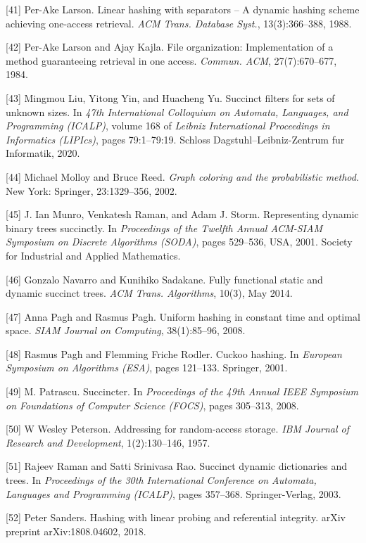 \documentclass[12pt,a4paper]{ctexart}
\theoremstyle{remark}
\begin{document}
[41] Per-Ake Larson. Linear hashing with separators -- A dynamic hashing scheme achieving one-access retrieval. \textit{ACM Trans. Database Syst.}, 13(3):366--388, 1988.

[42] Per-Ake Larson and Ajay Kajla. File organization: Implementation of a method guaranteeing retrieval in one access. \textit{Commun. ACM}, 27(7):670--677, 1984.

[43] Mingmou Liu, Yitong Yin, and Huacheng Yu. Succinct filters for sets of unknown sizes. In \textit{47th International Colloquium on Automata, Languages, and Programming (ICALP)}, volume 168 of \textit{Leibniz International Proceedings in Informatics (LIPIcs)}, pages 79:1--79:19. Schloss Dagstuhl--Leibniz-Zentrum fur Informatik, 2020.

[44] Michael Molloy and Bruce Reed. \textit{Graph coloring and the probabilistic method}. New York: Springer, 23:1329--356, 2002.

[45] J. Ian Munro, Venkatesh Raman, and Adam J. Storm. Representing dynamic binary trees succinctly. In \textit{Proceedings of the Twelfth Annual ACM-SIAM Symposium on Discrete Algorithms (SODA)}, pages 529--536, USA, 2001. Society for Industrial and Applied Mathematics.

[46] Gonzalo Navarro and Kunihiko Sadakane. Fully functional static and dynamic succinct trees. \textit{ACM Trans. Algorithms}, 10(3), May 2014.

[47] Anna Pagh and Rasmus Pagh. Uniform hashing in constant time and optimal space. \textit{SIAM Journal on Computing}, 38(1):85--96, 2008.

[48] Rasmus Pagh and Flemming Friche Rodler. Cuckoo hashing. In \textit{European Symposium on Algorithms (ESA)}, pages 121--133. Springer, 2001.

[49] M. Patrascu. Succincter. In \textit{Proceedings of the 49th Annual IEEE Symposium on Foundations of Computer Science (FOCS)}, pages 305--313, 2008.

[50] W Wesley Peterson. Addressing for random-access storage. \textit{IBM Journal of Research and Development}, 1(2):130--146, 1957.

[51] Rajeev Raman and Satti Srinivasa Rao. Succinct dynamic dictionaries and trees. In \textit{Proceedings of the 30th International Conference on Automata, Languages and Programming (ICALP)}, pages 357--368. Springer-Verlag, 2003.

[52] Peter Sanders. Hashing with linear probing and referential integrity. arXiv preprint arXiv:1808.04602, 2018.
\end{document}
